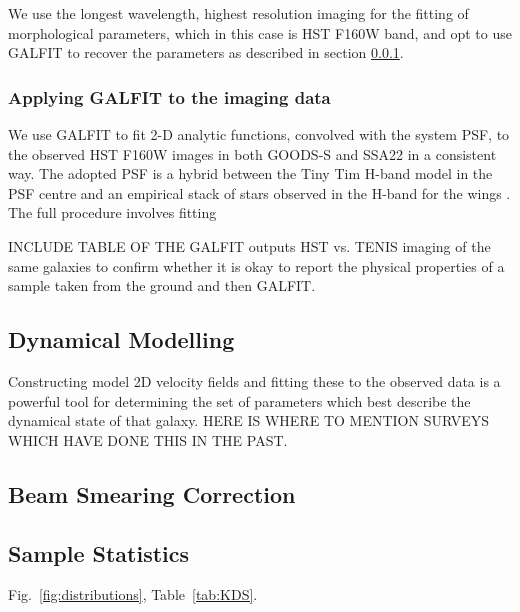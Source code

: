 \documentclass[a4paper,fleqn,usenatbib]{mn2e}
\begin{document}
We use the longest wavelength, highest resolution imaging for the fitting of morphological parameters, which in this case is HST F160W band, and opt to use GALFIT \citep{Peng2010_galfit} to recover the parameters as described in section \ref{subsubsec:galfitting}.

\subsubsection{Applying GALFIT to the imaging data}\label{subsubsec:galfitting}
We use GALFIT to fit 2-D analytic functions, convolved with the system PSF, to the observed HST F160W images in both GOODS-S and SSA22 in a consistent way.
The adopted PSF is a hybrid between the Tiny Tim H-band model \citep{Krist2011} in the PSF centre and an empirical stack of stars observed in the H-band for the wings \citep{VanderWel2012}.
The full procedure involves fitting \citep{Bertin1996}




INCLUDE TABLE OF THE GALFIT outputs
HST vs. TENIS imaging of the same galaxies to confirm whether it is okay to report the physical properties of a sample taken from the ground and then GALFIT.




\subsection{Dynamical Modelling}
Constructing model 2D velocity fields and fitting these to the observed data is a powerful tool for determining the set of parameters which best describe the dynamical state of that galaxy.
HERE IS WHERE TO MENTION SURVEYS WHICH HAVE DONE THIS IN THE PAST.


\subsection{Beam Smearing Correction}





  




\subsection{Sample Statistics}



Fig.~\ref{fig:distributions}, Table~\ref{tab:KDS}.
\end{document}
